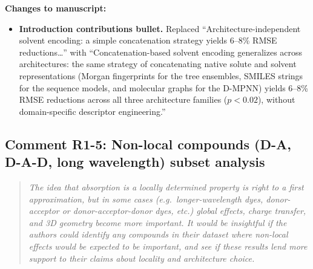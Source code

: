 \documentclass[11pt]{article}
\newenvironment{reviewer}{%
  \begin{quote}\itshape\color{black!70}}{%
  \end{quote}}
\newenvironment{changes}{%
  \noindent\textbf{Changes to manuscript:}
  \begin{itemize}[leftmargin=2em,itemsep=2pt]}{%
  \end{itemize}\medskip}
\begin{document}
\begin{changes}
 \item \textbf{Introduction contributions bullet.} Replaced ``Architecture-independent solvent encoding: a simple concatenation strategy yields 6--8\% RMSE reductions\ldots'' with ``Concatenation-based solvent encoding generalizes across architectures: the same strategy of concatenating native solute and solvent representations (Morgan fingerprints for the tree ensembles, SMILES strings for the sequence models, and molecular graphs for the D-MPNN) yields 6--8\% RMSE reductions across all three architecture families ($p < 0.02$), without domain-specific descriptor engineering.''
\end{changes}

\subsection*{Comment R1-5: Non-local compounds (D-A, D-A-D, long wavelength) subset analysis}
\begin{reviewer}
The idea that absorption is a locally determined property is right to a first approximation, but in some cases (e.g.\ longer-wavelength dyes, donor-acceptor or donor-acceptor-donor dyes, etc.) global effects, charge transfer, and 3D geometry become more important. It would be insightful if the authors could identify any compounds in their dataset where non-local effects would be expected to be important, and see if these results lend more support to their claims about locality and architecture choice.
\end{reviewer}
\end{document}
